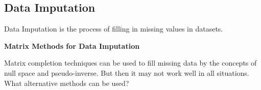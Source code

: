 \documentclass[11pt,a4paper]{article}
\theoremstyle{definition}
\begin{document}
\subsection*{Data Imputation}

Data Imputation is the process of filling in missing values in datasets.


\textbf{Matrix Methods for Data Imputation}

Matrix completion techniques can be used to fill missing data by the concepts of null space and pseudo-inverse. 
But then it may not work well in all situations. What alternative methods can be used?
\end{document}
